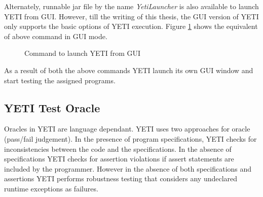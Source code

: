 Alternately, runnable jar file by the name {\it YetiLauncher} is also available to launch YETI from GUI. However, till the writing of this thesis, the GUI version of YETI only supports the basic options of YETI execution. Figure \ref{fig:yetiLauncher} shows the equivalent of above command in GUI mode.

\begin{figure}[h]
	\centering
	\caption{Command to launch YETI from GUI}
	\label{fig:yetiLauncher}
\end{figure}


As a result of both the above commands YETI launch its own GUI window and start testing the assigned programs. 

\subsection{YETI Test Oracle}
Oracles in YETI are language dependant. YETI uses two approaches for oracle (pass/fail judgement). In the presence of program specifications, YETI checks for inconsistencies between the code and the specifications. In the absence of specifications YETI checks for assertion violations if assert statements are included by the programmer. However in the absence of both specifications and assertions YETI performs robustness testing that considers any undeclared runtime exceptions as failures. 


